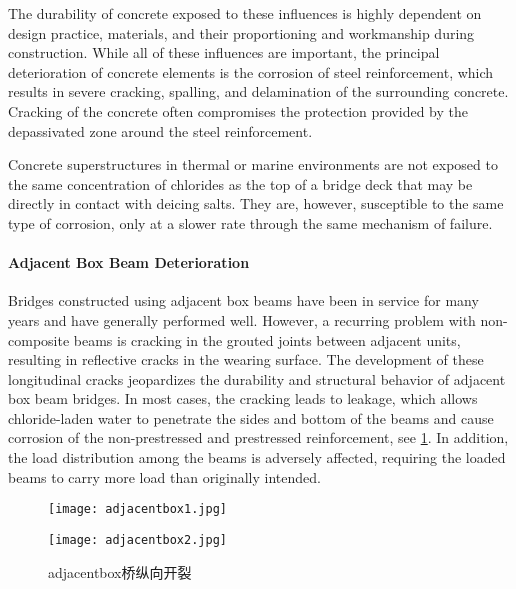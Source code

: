 The durability of concrete exposed to these influences is highly dependent on design practice, materials, and their proportioning and workmanship during construction. While all of these influences are important, the principal deterioration of concrete elements is the corrosion of steel reinforcement, which results in severe cracking, spalling, and delamination of the surrounding concrete. Cracking of the concrete often compromises the protection provided by the depassivated zone around the steel reinforcement.

Concrete superstructures in thermal or marine environments are not exposed to the same concentration of chlorides as the top of a bridge deck that may be directly in contact with deicing salts. They are, however, susceptible to the same type of corrosion, only at a slower rate through the same mechanism of failure.

\paragraph{Adjacent Box Beam Deterioration}
Bridges constructed using adjacent box beams have been in service for many years and have generally performed well. However, a recurring problem with non-composite beams is cracking in the grouted joints between adjacent units, resulting in reflective cracks in the wearing surface. The development of these longitudinal cracks jeopardizes the durability and structural behavior of adjacent box beam bridges. In most cases, the cracking leads to leakage, which allows chloride-laden water to penetrate the sides and bottom of the beams and cause corrosion of the non-prestressed and prestressed reinforcement, see \cref{fig:longitudinal-cracking-adjacent-box-beam}. In addition, the load distribution among the beams is adversely affected, requiring the loaded beams to carry more load than originally intended.

\begin{figure}
  \begin{minipage}{0.5\linewidth}\centering
    \texttt{[image: adjacentbox1.jpg]}
  \end{minipage}%
  \begin{minipage}{0.5\linewidth}\centering
    \texttt{[image: adjacentbox2.jpg]}
  \end{minipage}
  \caption{\gls*{adjacentbox}桥纵向开裂}
  \label{fig:longitudinal-cracking-adjacent-box-beam}
\end{figure}

